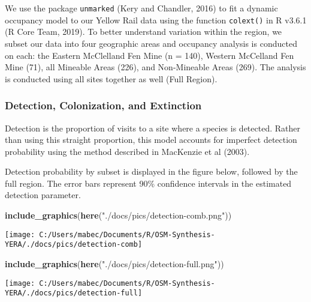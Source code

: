 \documentclass[11pt,]{article}
\newenvironment{Shaded}{\begin{snugshade}}{\end{snugshade}}
\newcommand{\KeywordTok}[1]{\textcolor[rgb]{0.13,0.29,0.53}{\textbf{#1}}}
\newcommand{\StringTok}[1]{\textcolor[rgb]{0.31,0.60,0.02}{#1}}
\newcommand{\NormalTok}[1]{#1}
\begin{document}
We use the package \texttt{unmarked} (Kery and Chandler, 2016) to fit a
dynamic occupancy model to our Yellow Rail data using the function
\texttt{colext()} in R v3.6.1 (R Core Team, 2019). To better understand
variation within the region, we subset our data into four geographic
areas and occupancy analysis is conducted on each: the Eastern
McClelland Fen Mine (n = 140), Western McCelland Fen Mine (71), all
Mineable Areas (226), and Non-Mineable Areas (269). The analysis is
conducted using all sites together as well (Full Region).

\subsubsection{Detection, Colonization, and
Extinction}\label{detection-colonization-and-extinction}

Detection is the proportion of visits to a site where a species is
detected. Rather than using this straight proportion, this model
accounts for imperfect detection probability using the method described
in MacKenzie et al (2003).

Detection probability by subset is displayed in the figure below,
followed by the full region. The error bars represent 90\% confidence
intervals in the estimated detection parameter.

\begin{Shaded}
\begin{Highlighting}[]
\KeywordTok{include_graphics}\NormalTok{(}\KeywordTok{here}\NormalTok{(}\StringTok{"./docs/pics/detection-comb.png"}\NormalTok{))}
\end{Highlighting}
\end{Shaded}

\begin{center}\texttt{[image: C:/Users/mabec/Documents/R/OSM-Synthesis-YERA/./docs/pics/detection-comb]} \end{center}

\begin{Shaded}
\begin{Highlighting}[]
\KeywordTok{include_graphics}\NormalTok{(}\KeywordTok{here}\NormalTok{(}\StringTok{"./docs/pics/detection-full.png"}\NormalTok{))}
\end{Highlighting}
\end{Shaded}

\begin{center}\texttt{[image: C:/Users/mabec/Documents/R/OSM-Synthesis-YERA/./docs/pics/detection-full]} \end{center}
\end{document}
